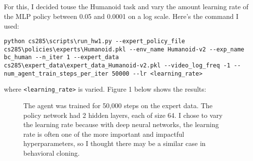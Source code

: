 \documentclass[10pt,a4paper]{article}
\begin{document}
\subsection{}

For this, I decided touse the Humanoid task and  vary the amount learning rate of the MLP policy between 0.05 and 0.0001 on a log 
scale. Here's the command I used: 

\begin{lstlisting}
python cs285\scripts\run_hw1.py --expert_policy_file cs285\policies\experts\Humanoid.pkl --env_name Humanoid-v2 --exp_name bc_human --n_iter 1 --expert_data cs285\expert_data\expert_data_Humanoid-v2.pkl --video_log_freq -1 --num_agent_train_steps_per_iter 50000 --lr <learning_rate>
\end{lstlisting}
\noindent
where \texttt{<learning\_rate>} is varied. Figure 1 below shows the results:

\begin{figure}
    \centering
    
    \caption{
    The agent was trained for 50,000 steps on the expert data. The policy network had 2 hidden layers, each of size 64. I chose to
	vary the learning rate because with deep neural networks, the learning rate is often one of the more important and impactful
	hyperparameters, so I thought there may be a similar case in behavioral cloning.}
\end{figure}

\noindent
\end{document}
